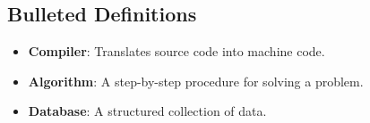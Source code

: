 \documentclass{article}
\begin{document}
\subsection*{Bulleted Definitions}

\begin{itemize}
    \item \textbf{Compiler}: Translates source code into machine code.
    \item \textbf{Algorithm}: A step-by-step procedure for solving a problem.
    \item \textbf{Database}: A structured collection of data.
\end{itemize}
\end{document}
